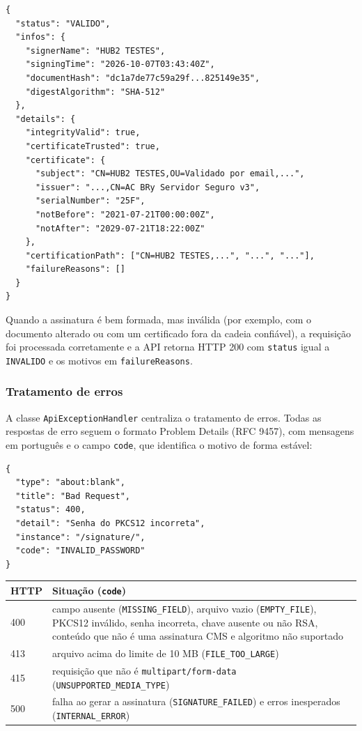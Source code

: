 \documentclass[12pt,a4paper]{article}
\begin{document}
\begin{lstlisting}
{
  "status": "VALIDO",
  "infos": {
    "signerName": "HUB2 TESTES",
    "signingTime": "2026-10-07T03:43:40Z",
    "documentHash": "dc1a7de77c59a29f...825149e35",
    "digestAlgorithm": "SHA-512"
  },
  "details": {
    "integrityValid": true,
    "certificateTrusted": true,
    "certificate": {
      "subject": "CN=HUB2 TESTES,OU=Validado por email,...",
      "issuer": "...,CN=AC BRy Servidor Seguro v3",
      "serialNumber": "25F",
      "notBefore": "2021-07-21T00:00:00Z",
      "notAfter": "2029-07-21T18:22:00Z"
    },
    "certificationPath": ["CN=HUB2 TESTES,...", "...", "..."],
    "failureReasons": []
  }
}
\end{lstlisting}

Quando a assinatura é bem formada, mas inválida (por exemplo, com o documento alterado ou com um certificado fora da cadeia confiável), a requisição foi processada corretamente e a API retorna HTTP 200 com \texttt{status} igual a \texttt{INVALIDO} e os motivos em \texttt{failureReasons}.

\subsubsection{Tratamento de erros}

A classe \texttt{ApiExceptionHandler} centraliza o tratamento de erros. Todas as respostas de erro seguem o formato Problem Details (RFC 9457), com mensagens em português e o campo \texttt{code}, que identifica o motivo de forma estável:

\begin{lstlisting}
{
  "type": "about:blank",
  "title": "Bad Request",
  "status": 400,
  "detail": "Senha do PKCS12 incorreta",
  "instance": "/signature/",
  "code": "INVALID_PASSWORD"
}
\end{lstlisting}

\begin{center}
\small
\begin{tabularx}{\textwidth}{lX}
\toprule
\textbf{HTTP} & \textbf{Situação (\texttt{code})} \\
\midrule
400 & campo ausente (\texttt{MISSING\_FIELD}), arquivo vazio (\texttt{EMPTY\_FILE}), PKCS12 inválido, senha incorreta, chave ausente ou não RSA, conteúdo que não é uma assinatura CMS e algoritmo não suportado \\
413 & arquivo acima do limite de 10 MB (\texttt{FILE\_TOO\_LARGE}) \\
415 & requisição que não é \texttt{multipart/form-data} (\texttt{UNSUPPORTED\_MEDIA\_TYPE}) \\
500 & falha ao gerar a assinatura (\texttt{SIGNATURE\_FAILED}) e erros inesperados (\texttt{INTERNAL\_ERROR}) \\
\bottomrule
\end{tabularx}
\end{center}
\end{document}
